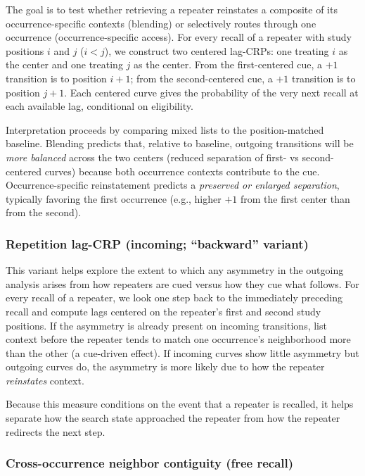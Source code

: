 \documentclass[
  man,
  floatsintext,
  longtable,
  nolmodern,
  notxfonts,
  notimes,
  draftfirst,
  colorlinks=true,linkcolor=blue,citecolor=blue,urlcolor=blue]{apa7}
\begin{document}
The goal is to test whether retrieving a repeater reinstates a composite
of its occurrence-specific contexts (blending) or selectively routes
through one occurrence (occurrence-specific access). For every recall of
a repeater with study positions \(i\) and \(j\) (\(i<j\)), we construct
two centered lag-CRPs: one treating \(i\) as the center and one treating
\(j\) as the center. From the first-centered cue, a \(+1\) transition is
to position \(i{+}1\); from the second-centered cue, a \(+1\) transition
is to position \(j{+}1\). Each centered curve gives the probability of
the very next recall at each available lag, conditional on eligibility.

Interpretation proceeds by comparing mixed lists to the position-matched
baseline. Blending predicts that, relative to baseline, outgoing
transitions will be \emph{more balanced} across the two centers (reduced
separation of first- vs second-centered curves) because both occurrence
contexts contribute to the cue. Occurrence-specific reinstatement
predicts a \emph{preserved or enlarged separation}, typically favoring
the first occurrence (e.g., higher \(+1\) from the first center than
from the second).

\subsubsection{Repetition lag-CRP (incoming; ``backward''
variant)}\label{repetition-lag-crp-incoming-backward-variant}

This variant helps explore the extent to which any asymmetry in the
outgoing analysis arises from how repeaters are cued versus how they cue
what follows. For every recall of a repeater, we look one step back to
the immediately preceding recall and compute lags centered on the
repeater's first and second study positions. If the asymmetry is already
present on incoming transitions, list context before the repeater tends
to match one occurrence's neighborhood more than the other (a cue-driven
effect). If incoming curves show little asymmetry but outgoing curves
do, the asymmetry is more likely due to how the repeater
\emph{reinstates} context.

Because this measure conditions on the event that a repeater is
recalled, it helps separate how the search state approached the repeater
from how the repeater redirects the next step.

\subsubsection{Cross-occurrence neighbor contiguity (free
recall)}\label{cross-occurrence-neighbor-contiguity-free-recall}
\end{document}
